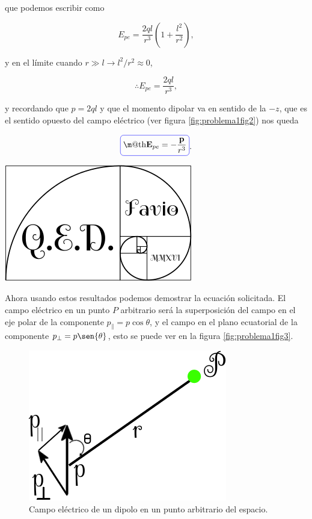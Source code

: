 \documentclass[a4paper,11pt]{article}
\makeatletter
\numberwithin{equation}{section}
\newcommand*{\boxcolor}{blue}
\renewcommand{\boxed}[1]{\textcolor{\boxcolor}{%
\tikz[baseline={([yshift=-1ex]current bounding box.center)}] \node [rectangle, minimum width=1ex,rounded corners,draw] {\normalcolor\m@th$\displaystyle#1$};}}
\makeatother
\begin{document}
que podemos escribir como 

\begin{equation}
 E_{pe} = \frac{2ql}{r^3}\left(1 + \frac{l^2}{r^2} \right),
\end{equation}

y en el límite cuando $r \gg l \rightarrow l^2/r^2 \approx 0$,

\begin{equation}
 \therefore E_{pe} = \frac{2ql}{r^3},
\end{equation}

y recordando que $p = 2ql$ y que el momento dipolar va en sentido de la $-z$, que 
es el sentido opuesto del campo eléctrico (ver figura \eqref{fig:problema1fig2}) nos queda 

\begin{equation}
 \boxed{\mathbf{E}_{pe} = - \frac{\mathbf{p}}{r^3}}.
\end{equation}

\hspace{10cm}\includegraphics[scale=0.25]{logoQED}

\vspace{.2cm}

Ahora usando estos resultados podemos demostrar la ecuación solicitada. El campo 
eléctrico en un punto $P$ arbitrario será la superposición del campo en el eje polar 
de la componente $p_{\parallel} = p \cos{\theta}$, y el campo en el plano ecuatorial de la 
componente $p_{\bot} = p\sen{\theta}$, esto se puede ver en la figura 
\eqref{fig:problema1fig3}.

\begin{figure}[H]
 \center 
 \includegraphics[scale=0.5]{problema1fig3}
 \caption{Campo eléctrico de un dipolo en un punto arbitrario del espacio.}
 \label{fig:problema1fig3}
\end{figure}
\end{document}
